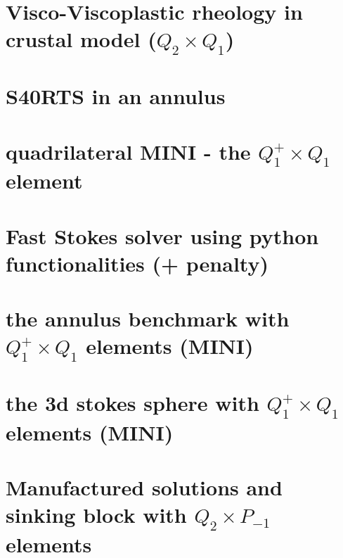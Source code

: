 \documentclass[a4paper,11pt]{report}
\begin{document}
\chapter{Visco-Viscoplastic rheology in crustal model ($Q_2\times Q_1$)\label{f70}} %

\chapter{S40RTS in an annulus \label{f71}} %

\chapter{quadrilateral MINI - the $Q_1^+\times Q_1$ element \label{f72}} %

\chapter{Fast Stokes solver using python functionalities (\QonePzero + penalty)\label{f73}} %

\chapter{the annulus benchmark with $Q_1^+\times Q_1$ elements (MINI) \label{f74}} %

\chapter{the 3d stokes sphere with $Q_1^{+}\times Q_1$ elements (MINI) \label{f75}} %

\chapter{Manufactured solutions and sinking block with $Q_2\times P_{-1}$ elements \label{f76}} %
\end{document}
